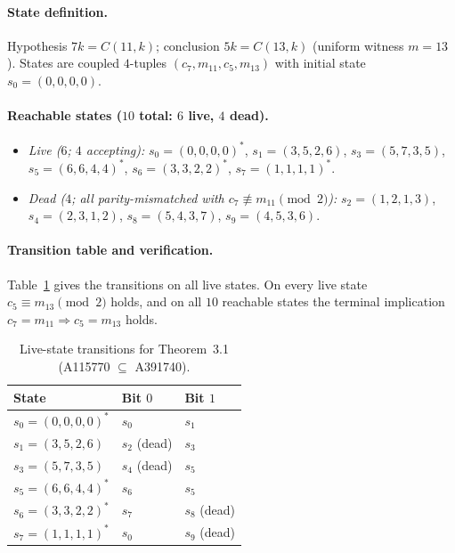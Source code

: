 \documentclass[11pt]{article}
\begin{document}
\paragraph{State definition.}
Hypothesis $7k = C(11,k)$; conclusion $5k = C(13,k)$ (uniform witness $m = 13$). States are coupled $4$-tuples $(c_7, m_{11}, c_5, m_{13})$ with initial state $s_0 = (0,0,0,0)$.

\paragraph{Reachable states ($10$ total: $6$ live, $4$ dead).}
\begin{itemize}
  \item \emph{Live ($6$; $4$ accepting):}
  $s_0 = (0,0,0,0)^*$, $s_1 = (3,5,2,6)$, $s_3 = (5,7,3,5)$, $s_5 = (6,6,4,4)^*$, $s_6 = (3,3,2,2)^*$, $s_7 = (1,1,1,1)^*$.
  \item \emph{Dead ($4$; all parity-mismatched with $c_7 \not\equiv m_{11} \pmod{2}$):}
  $s_2 = (1,2,1,3)$, $s_4 = (2,3,1,2)$, $s_8 = (5,4,3,7)$, $s_9 = (4,5,3,6)$.
\end{itemize}

\paragraph{Transition table and verification.}
Table~\ref{tab:app-31} gives the transitions on all live states. On every live state $c_5 \equiv m_{13} \pmod{2}$ holds, and on all $10$ reachable states the terminal implication $c_7 = m_{11} \Rightarrow c_5 = m_{13}$ holds.

\begin{table}[ht]
\centering
\small
\begin{tabular}{lll}
\hline
State & Bit $0$ & Bit $1$ \\
\hline
$s_0 = (0,0,0,0)^*$ & $s_0$ & $s_1$ \\
$s_1 = (3,5,2,6)$ & $s_2$ (dead) & $s_3$ \\
$s_3 = (5,7,3,5)$ & $s_4$ (dead) & $s_5$ \\
$s_5 = (6,6,4,4)^*$ & $s_6$ & $s_5$ \\
$s_6 = (3,3,2,2)^*$ & $s_7$ & $s_8$ (dead) \\
$s_7 = (1,1,1,1)^*$ & $s_0$ & $s_9$ (dead) \\
\hline
\end{tabular}
\caption{Live-state transitions for Theorem~3.1 (A115770 $\subseteq$ A391740).}
\label{tab:app-31}
\end{table}
\end{document}
